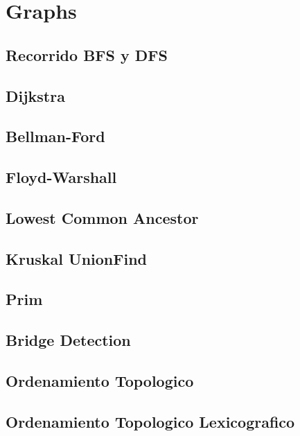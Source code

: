 \section{Graphs}
\subsection{Recorrido BFS y DFS}
\raggedbottom
\hrulefill
\subsection{Dijkstra}
\raggedbottom
\hrulefill
\subsection{Bellman-Ford}
\raggedbottom
\hrulefill
\subsection{Floyd-Warshall}
\raggedbottom
\hrulefill
\subsection{Lowest Common Ancestor}
\raggedbottom
\hrulefill
\subsection{Kruskal UnionFind}
\raggedbottom
\hrulefill
\subsection{Prim}
\raggedbottom
\hrulefill
\subsection{Bridge Detection}
\raggedbottom
\hrulefill
\subsection{Ordenamiento Topologico}
\raggedbottom
\hrulefill
\subsection{Ordenamiento Topologico Lexicografico}
\raggedbottom
\hrulefill

